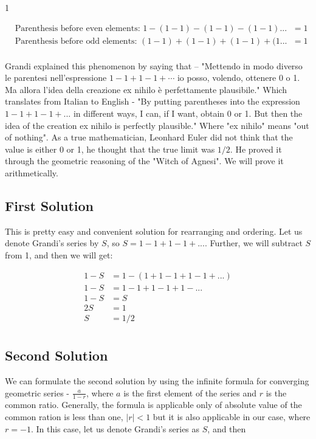 1\documentclass[a4paper]{article}
\begin{document}
\begin{align*}
&\text{Parenthesis before even elements: } 1-(1-1)-(1-1)-(1-1)...&=1\\
&\text{Parenthesis before odd elements: } (1-1)+(1-1)+(1-1)+(1...&=1\\
\end{align*}

Grandi explained this phenomenon by saying that – "Mettendo in modo diverso le parentesi
nell'espressione $1-1+1-1+\cdots$ io posso, volendo, ottenere 0 o 1. Ma allora l'idea della creazione ex
nihilo è perfettamente plausibile."\cite{Mettendo} Which translates from Italian to English - "By putting parentheses into the expression
$1-1+1-1+...$ in different ways, I can, if I want, obtain 0 or 1. But then the idea of the creation
ex nihilo is perfectly plausible." Where "ex nihilo" means "out of nothing".\cite{Exnihilo}
As a true mathematician, Leonhard Euler did not think that the value is either 0 or 1, he thought that the true limit was $1/2$.
He proved it through the geometric reasoning of the "Witch of Agnesi". We will prove it arithmetically.

\subsection{First Solution}

This is pretty easy and convenient solution for rearranging and ordering. Let us denote Grandi’s
series by $S$, so $S=1-1+1-1+...$. Further, we will subtract $S$ from 1, and then we will get:

\begin{align*}
  1-S&=1-(1+1-1+1-1+...)\\
  1-S&=1-1+1-1+1-...\\
  1-S&=S\\
  2S&=1\\
  S&=1/2\\
  \end{align*}

\subsection{Second Solution}

We can formulate the second solution by using the infinite formula for converging geometric
series - $\frac{a}{1-r}$, where $a$ is the first element of the series and $r$ is the common ratio.
Generally, the formula is applicable only of absolute value of the common ration is less than one, $|r| < 1$ but
it is also applicable in our case, where $r = - 1$. In this case, let us denote Grandi's series as $S$, and
then
\end{document}
